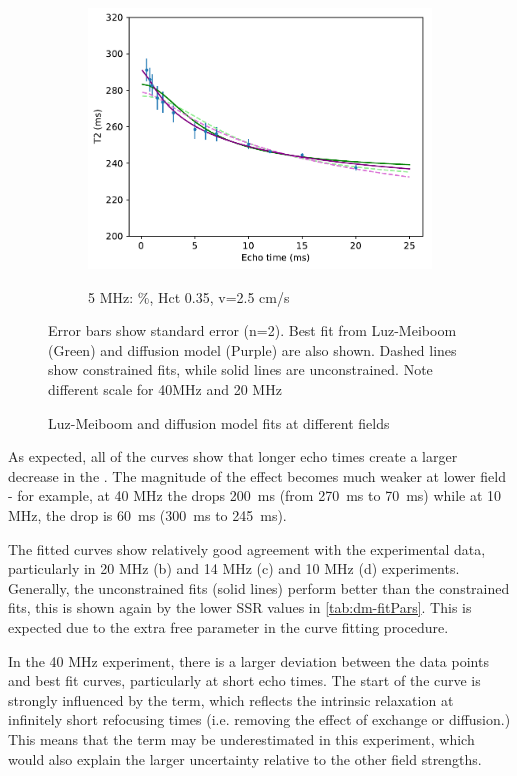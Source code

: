 \begin{figure}[h!tp]
{  \begin{subfigure}[c]{0.6\textwidth}
  \caption{5 MHz: \%, Hct 0.35, v=2.5 cm/s}
  \includegraphics[width=\textwidth]{figures/diffmodels/5MHzT2.pdf}
  \label{fig:dm-fitResults5}
  \end{subfigure}
  \parbox[pos=c]{0.6\textwidth}{
  Error bars show standard error (n=2). Best fit from Luz-Meiboom (Green) and diffusion model (Purple) are also shown. Dashed lines show constrained fits, while solid lines are unconstrained. Note different scale for 40MHz and 20 MHz}
  }
  \caption[Luz-Meiboom and diffusion model fits at different fields]{Luz-Meiboom and diffusion model fits at different fields}
  \label{fig:dm-fitResults}
\end{figure}

As expected, all of the curves show that longer echo times create a larger decrease in the \Ttwo.
The magnitude of the effect becomes much weaker at lower field - for example, at 40 MHz the \Ttwo drops \SI{200}{ms} (from \SI{270}{ms} to \SI{70}{ms}) while at 10 MHz, the \Ttwo drop is \SI{60}{ms} (\SI{300}{ms} to \SI{245}{ms}).

The fitted curves show relatively good agreement with the experimental data, particularly in 20 MHz (b) and 14 MHz (c) and 10 MHz (d) experiments.
Generally, the unconstrained fits (solid lines) perform better than the constrained fits, this is shown again by the lower SSR values in \autoref{tab:dm-fitPars}.
This is expected due to the extra free parameter in the curve fitting procedure.

In the 40 MHz experiment, there is a larger deviation between the data points and best fit curves, particularly at short echo times.
The start of the curve is strongly influenced by the \TtwoO term, which reflects the intrinsic relaxation at infinitely short refocusing times (i.e. removing the effect of exchange or diffusion.)
This means that the  \TtwoO term may be underestimated in this experiment, which would also explain the larger uncertainty relative to the other field strengths.

